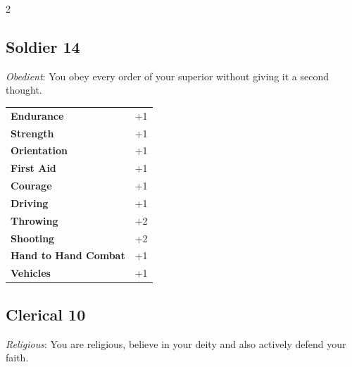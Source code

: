 \begin{multicols}{2}
\begin{tcolorbox}

\end{tcolorbox}

\begin{tcolorbox}
    \subsection*{Soldier \hfill \small{14 }}
    \tcblower
\textit{Obedient}: You obey every order of your superior without giving it a second thought.


\vspace{3mm}

\begin{tabular}{@{}ll@{}}
    \textbf{Endurance} & +1\\
    \textbf{Strength} & +1\\
    \textbf{Orientation} & +1\\
    \textbf{First Aid} & +1\\
    \textbf{Courage} & +1\\
    \textbf{Driving} & +1\\
    \textbf{Throwing} & +2\\
    \textbf{Shooting} & +2\\
    \textbf{Hand to Hand Combat} & +1\\
    \textbf{Vehicles} & +1\\
\end{tabular}


\end{tcolorbox}

\begin{tcolorbox}
    \subsection*{Clerical \hfill \small{10 }}
    \tcblower
\textit{Religious}: You are religious, believe in your deity and also actively defend your faith.



\end{tcolorbox}
\end{multicols}
